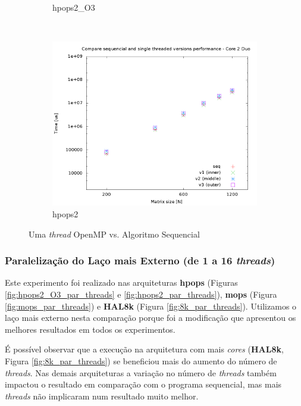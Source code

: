 \documentclass[a4paper, 12pt]{article}
\begin{document}
\begin{figure}[H]
\begin{subfigure}[H]{0.5\textwidth}
        \caption{hpops2\_O3}
        \label{fig:hpops2_O3_cmp_single}
    \end{subfigure}
    ~ %
    \begin{subfigure}[H]{0.5\textwidth}
        \includegraphics[width=\textwidth]{cmp_single_thread_hpops2}
        \caption{hpops2}
        \label{fig:hpops2_cmp_single}
    \end{subfigure}
    \caption{Uma \textit{thread} OpenMP vs. Algoritmo Sequencial}\label{fig:single_vs_openmp}
\end{figure}

\subsubsection{Paralelização do Laço mais Externo (de 1 a 16 \textit{threads})}

Este experimento foi realizado nas arquiteturas \textbf{hpops}
(Figuras \ref{fig:hpops2_O3_par_threads} e \ref{fig:hpops2_par_threads}),
\textbf{mops} (Figura \ref{fig:mops_par_threads}) e \textbf{HAL8k}
(Figura \ref{fig:8k_par_threads}). Utilizamos o laço mais externo
nesta comparação porque foi a modificação que apresentou os melhores
resultados em todos os experimentos.

É possível observar que a execução na arquitetura com mais \textit{cores}
(\textbf{HAL8k}, Figura \ref{fig:8k_par_threads}) se beneficiou mais
do aumento do número de \textit{threads}. Nas demais arquiteturas a
variação no número de \textit{threads} também impactou o resultado em
comparação com o programa sequencial, mas mais \textit{threads} não
implicaram num resultado muito melhor.
\end{document}
